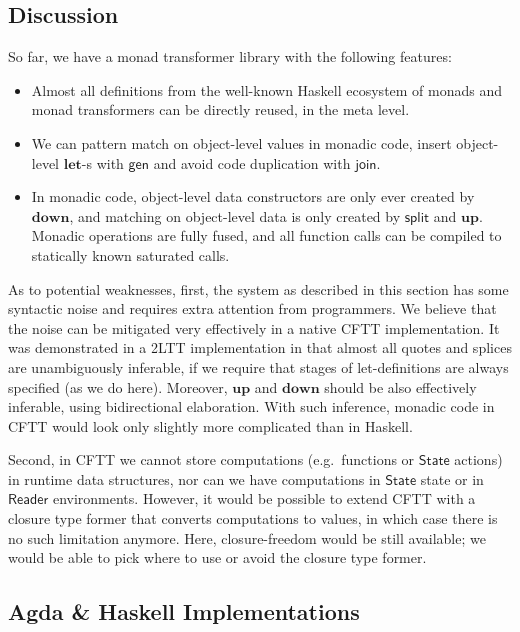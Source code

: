 \documentclass[acmsmall,screen]{acmart}
\newcommand{\mit}[1]{{\mathsf{#1}}}
\newcommand{\msf}[1]{{\mathsf{#1}}}
\newcommand{\mbf}[1]{{\mathbf{#1}}}
\newcommand{\Reader}{\msf{Reader}}
\theoremstyle{remark}
\newcommand{\mup}{\mbf{up}}
\newcommand{\mdown}{\mbf{down}}
\newcommand{\gen}{\mit{gen}}
\newcommand{\State}{\msf{State}}
\newcommand{\join}{\mit{join}}
\begin{document}
\subsection{Discussion}

So far, we have a monad transformer library with the following features:
\begin{itemize}
\item Almost all definitions from the well-known Haskell ecosystem of monads and monad transformers
      can be directly reused, in the meta level.
\item We can pattern match on object-level values in monadic code, insert object-level $\mbf{let}$-s
      with $\gen$ and avoid code duplication with $\join$.
\item In monadic code, object-level data constructors are only ever created by
      $\mdown$, and matching on object-level data is only created by $\mit{split}$
      and $\mup$. Monadic operations are fully fused, and all function calls can be
      compiled to statically known saturated calls.
\end{itemize}

As to potential weaknesses, first, the system as described in this section has
some syntactic noise and requires extra attention from programmers.  We believe
that the noise can be mitigated very effectively in a native CFTT
implementation. It was demonstrated in a 2LTT implementation in
\cite{staged-demo} that almost all quotes and splices are unambiguously
inferable, if we require that stages of let-definitions are always specified (as
we do here). Moreover, $\mup$ and $\mdown$ should be also effectively inferable,
using bidirectional elaboration. With such inference, monadic code in CFTT would
look only slightly more complicated than in Haskell.

Second, in CFTT we cannot store computations (e.g.\ functions or $\State$
actions) in runtime data structures, nor can we have computations in $\State$
state or in $\Reader$ environments. However, it would be possible to extend CFTT
with a closure type former that converts computations to values, in which case
there is no such limitation anymore. Here, closure-freedom would be still
available; we would be able to pick where to use or avoid the closure type
former.

\subsection{Agda \& Haskell Implementations}
\end{document}

